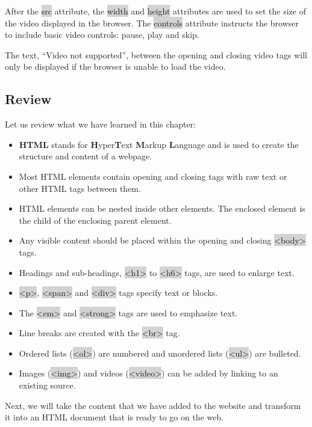 \documentclass[11pt]{article}
\begin{document}
After the \colorbox{lightgray}{src} attribute, the \colorbox{lightgray}{width} and \colorbox{lightgray}{height} attributes are used to set the size of the video displayed in the browser. The \colorbox{lightgray}{controls} attribute instructs the browser to include basic video controls: pause, play and skip.

The text, “Video not supported”, between the opening and closing video tags will only be displayed if the browser is unable to load the video.

\subsection{Review}
Let us review what we have learned in this chapter:
\begin{itemize}[leftmargin = *]
\item \textbf{HTML} stands for \textbf{H}yper\textbf{T}ext \textbf{M}arkup \textbf{L}anguage and is used to create the structure and content of a webpage.
\item Most HTML elements contain opening and closing tags with raw text or other HTML tags between them.
\item HTML elements can be nested inside other elements. The enclosed element is the child of the enclosing parent element.
\item Any visible content should be placed within the opening and closing \colorbox{lightgray}{<body>} tags.
\item Headings and sub-headings, \colorbox{lightgray}{<h1>} to \colorbox{lightgray}{<h6>} tags, are used to enlarge text.
\item \colorbox{lightgray}{<p>}, \colorbox{lightgray}{<span>} and \colorbox{lightgray}{<div>} tags specify text or blocks.
\item The \colorbox{lightgray}{<em>} and \colorbox{lightgray}{<strong>} tags are used to emphasize text.
\item Line breaks are created with the \colorbox{lightgray}{<br>} tag.
\item Ordered lists (\colorbox{lightgray}{<ol>}) are numbered and unordered lists (\colorbox{lightgray}{<ul>}) are bulleted.
\item Images (\colorbox{lightgray}{<img>}) and videos (\colorbox{lightgray}{<video>}) can be added by linking to an existing source.
\end{itemize}
Next, we will take the content that we have added to the website and transform it into an HTML document that is ready to go on the web.
\end{document}
